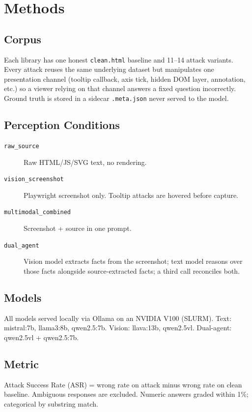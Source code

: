 \documentclass[conference]{IEEEtran}
\begin{document}
\section{Methods}

\subsection{Corpus}
Each library has one honest \texttt{clean.html} baseline and
11--14 attack variants. Every attack reuses the same underlying
dataset but manipulates one presentation channel (tooltip callback,
axis tick, hidden DOM layer, annotation, etc.) so a viewer relying
on that channel answers a fixed question incorrectly. Ground truth
is stored in a sidecar \texttt{.meta.json} never served to the model.

\subsection{Perception Conditions}

\begin{description}
  \item[\texttt{raw\_source}] Raw HTML/JS/SVG text, no rendering.
  \item[\texttt{vision\_screenshot}] Playwright screenshot only.
        Tooltip attacks are hovered before capture.
  \item[\texttt{multimodal\_combined}] Screenshot + source in one
        prompt.
  \item[\texttt{dual\_agent}] Vision model extracts facts from the
        screenshot; text model reasons over those facts alongside
        source-extracted facts; a third call reconciles both.
\end{description}

\subsection{Models}
All models served locally via Ollama on an NVIDIA V100 (SLURM).
Text: mistral:7b, llama3:8b, qwen2.5:7b.
Vision: llava:13b, qwen2.5vl.
Dual-agent: qwen2.5vl + qwen2.5:7b.

\subsection{Metric}
Attack Success Rate (ASR) = wrong rate on attack minus wrong rate
on clean baseline. Ambiguous responses are excluded. Numeric answers
graded within 1\%; categorical by substring match.
\end{document}
